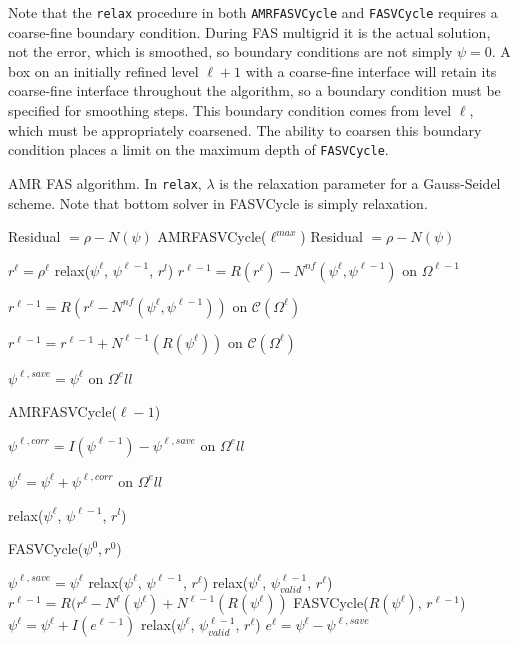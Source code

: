 \documentclass[10pt]{article}
\begin{document}
Note that the \texttt{relax} procedure in both \texttt{AMRFASVCycle} and \texttt{FASVCycle} requires a coarse-fine boundary condition. During FAS multigrid it is the actual solution, not the error, which is smoothed, so boundary conditions are not simply $\psi=0$. A box on an initially refined level $\ell+1$ with a coarse-fine interface will retain its coarse-fine interface throughout the algorithm, so a boundary condition must be specified for smoothing steps. This boundary condition comes from level $\ell$, which must be appropriately coarsened. The ability to coarsen this boundary condition places a limit on the maximum depth of \texttt{FASVCycle}.

\begin{algorithm}
\caption{AMR FAS algorithm. In \texttt{relax}, $\lambda$ is the relaxation parameter for a Gauss-Seidel scheme. Note that bottom solver in FASVCycle is simply relaxation.}\label{alg:AMRFAS}
\begin{algorithmic}[1]
\State Residual $ = \rho - N(\psi)$
\State AMRFASVCycle($\ell^{max}$)
\State Residual $ = \rho - N(\psi)$
\EndWhile

 $r^\ell= \rho^\ell$ \EndIf
{}
\State relax($\psi^\ell$, $\psi^{\ell-1}$, $r^l$)
\State $r^{\ell-1} = R(r^\ell) - N^{nf}(\psi^\ell, \psi^{\ell-1})$ on $\Omega^{\ell-1}$

\State $r^{\ell-1} = R(r^\ell - N^{nf}(\psi^\ell, \psi^{\ell-1}))$ on $\mathcal{C}(\Omega^{\ell})$

\State $r^{\ell-1} = r^{\ell-1} + N^{\ell-1}(R(\psi^{\ell}))$ on $\mathcal{C}(\Omega^{\ell})$

\State $\psi^{\ell, save} = \psi^\ell$ on $\Omega^ell$

\State AMRFASVCycle($\ell-1$)

\State $\psi^{\ell, corr} = I(\psi^{\ell-1}) - \psi^{\ell, save}$ on $\Omega^ell$

\State $\psi^{\ell} = \psi^\ell + \psi^{\ell, corr}$ on $\Omega^ell$

\State relax($\psi^\ell$, $\psi^{\ell-1}$, $r^l$)
 
\Else
\State FASVCycle($\psi^0, r^0$)
\EndIf
\EndProcedure

\State $\psi^{\ell, save} = \psi^\ell$
\State relax($\psi^\ell$, $\psi^{\ell-1}$, $r^\ell$)
\Else
\State relax($\psi^\ell$, $\psi_{valid}^{\ell-1}$, $r^\ell$)
\State $r^{\ell-1} = R(r^\ell - N^\ell(\psi^\ell) + N^{\ell-1}(R(\psi^\ell))$
\State FASVCycle($R(\psi^{\ell})$, $r^{\ell-1}$)
\State $\psi^\ell = \psi^\ell + I(e^{\ell-1})$
\State relax($\psi^\ell$, $\psi_{valid}^{\ell-1}$, $r^\ell$)
\EndIf
\State $e^\ell = \psi^\ell - \psi^{\ell, save}$
\EndProcedure



\end{algorithmic}
\end{algorithm}
\end{document}
